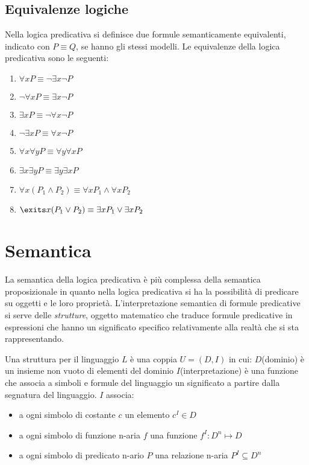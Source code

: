 
\subsection{Equivalenze logiche}
Nella logica predicativa si definisce due formule semanticamente equivalenti,
indicato con $P \equiv Q$, se hanno gli stessi modelli.
Le equivalenze della logica predicativa sono le seguenti:
\begin{enumerate}
    \item $\forall x P \equiv \neg \exists x \neg P$
    \item $\neg \forall x P \equiv \exists x \neg P$
    \item $\exists x P \equiv \neg \forall x \neg P$
    \item $\neg \exists x P \equiv \forall x \neg P$
    \item $\forall x \forall y P \equiv \forall y \forall x P$
    \item $\exists x \exists y P \equiv \exists y \exists x P$
    \item $\forall x(P_1 \land P_2) \equiv \forall x P_1 \land \forall x P_2$
    \item $\exits x(P_1 \lor P_2) \equiv \exists x P_1 \lor \exists x P_2$
\end{enumerate}

\section{Semantica}
La semantica della logica predicativa è più complessa della semantica proposizionale
in quanto nella logica predicativa si ha la possibilità di predicare su oggetti e le loro proprietà.
L'interpretazione semantica di formule predicative si serve delle \emph{strutture},
oggetto matematico che traduce formule predicative in espressioni che hanno un significato
specifico relativamente alla realtà che si sta rappresentando.

\begin{defi}
    Una struttura per il linguaggio $L$ è una coppia $U = (D,I)$ in cui:
    $D$(dominio) è un insieme non vuoto di elementi del dominio
    $I$(interpretazione) è una funzione che associa a simboli e formule del linguaggio
    un significato  a partire dalla segnatura del linguaggio.
    $I$ associa:
    \begin{itemize}
        \item a ogni simbolo di costante $c$ un elemento $c^I \in D$
        \item a ogni simbolo di funzione n-aria $f$ una funzione $f^I:D^n \mapsto D$
        \item a ogni simbolo di predicato n-ario $P$ una relazione n-aria $P^I \subseteq D^n$
    \end{itemize}
\end{defi}

